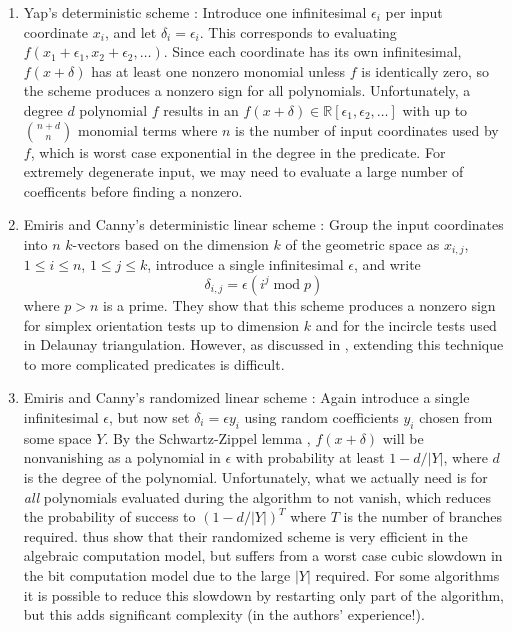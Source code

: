 \documentclass[11pt]{article}
\newcommand{\R}{\mathbb{R}}
\begin{document}
\begin{enumerate}
\item Yap's deterministic scheme \cite{yap1990symbolic}: Introduce one infinitesimal $\epsilon_i$ per input coordinate $x_i$, and let $\delta_i = \epsilon_i$.  This
corresponds to evaluating $f(x_1+\epsilon_1, x_2+\epsilon_2, \ldots)$.  Since each coordinate has its own infinitesimal, $f(x+\delta)$ has at least
one nonzero monomial unless $f$ is identically zero, so the scheme produces a nonzero sign for all polynomials.  Unfortunately, a degree $d$ polynomial
$f$ results in an $f(x+\delta) \in \R[\epsilon_1,\epsilon_2, \ldots]$ with up to $\binom{n + d}{n}$ monomial terms where $n$ is the number of input
coordinates used by $f$, which is worst case exponential in the degree in the predicate.  For extremely degenerate input, we may need to evaluate a large
number of coefficents before finding a nonzero.

\item Emiris and Canny's deterministic linear scheme \cite{emiris1992efficient}: Group the input coordinates into $n$ $k$-vectors based on the dimension
$k$ of the geometric space as $x_{i,j}$, $1 \le i \le n$, $1 \le j \le k$, introduce a single infinitesimal $\epsilon$, and write
$$\delta_{i,j} = \epsilon (i^j \operatorname{mod} p)$$
where $p > n$ is a prime.  They show that this scheme produces a nonzero sign for simplex orientation tests up to dimension $k$ and for
the incircle tests used in Delaunay triangulation.  However, as discussed in \cite{seidel1998nature}, extending this technique to more complicated predicates
is difficult.

\item Emiris and Canny's randomized linear scheme \cite{emiris1995general}: Again introduce a single infinitesimal $\epsilon$, but now set
$\delta_i = \epsilon y_i$ using random coefficients $y_i$ chosen from some space $Y$.  By the Schwartz-Zippel lemma \cite{schwartz1980fast}, $f(x+\delta)$
will be nonvanishing as a polynomial in $\epsilon$ with probability at least $1 - d/|Y|$, where $d$ is the degree of the polynomial.  Unfortunately, what we
actually need is for \emph{all} polynomials evaluated during the algorithm to not vanish, which reduces the probability of success to
$(1 - d/|Y|)^T$ where $T$ is the number of branches required.  \cite{emiris1995general} thus show that their randomized scheme is very efficient in the
algebraic computation model, but suffers from a worst case cubic slowdown in the bit computation model due to the large $|Y|$ required.  For some algorithms
it is possible to reduce this slowdown by restarting only part of the algorithm, but this adds significant complexity (in the authors' experience!).
\end{enumerate}
\end{document}
